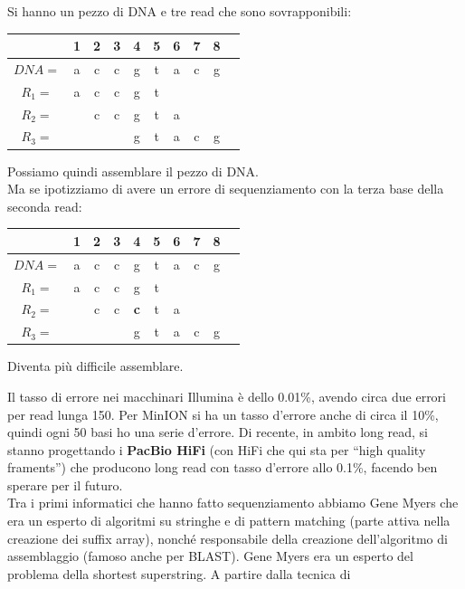 \documentclass[a4paper,12pt, oneside]{book}
\begin{document}
\begin{esempio}
  Si hanno un pezzo di DNA e tre read che sono sovrapponibili:
  \begin{table}[H]
    \centering
    \begin{tabular}{cccccccccc}
      \hline
      & 1 & 2 & 3 & 4 & 5 &6 &7 &8\\
      \hline
      $DNA=$ & a & c & c & g & t &a &c &g\\
      \hline
      $R_1=$ & a & c & c & g & t &&&\\
      $R_2=$ &  & c & c & g & t & a &&\\
      $R_3=$ &  &  &  & g &t & a &c & g&\\
    \end{tabular}
  \end{table}
  Possiamo quindi assemblare il pezzo di DNA.\\
  Ma se ipotizziamo di avere un errore di sequenziamento con la terza base della
  seconda read:
   \begin{table}[H]
    \centering
    \begin{tabular}{cccccccccc}
      \hline
      & 1 & 2 & 3 & 4 & 5 &6 &7 &8\\
      \hline
      $DNA=$ & a & c & c & g & t &a &c &g\\
      \hline
      $R_1=$ & a & c & c & g & t &&&\\
      $R_2=$ &  & c & c & \textbf{c} & t & a &&\\
      $R_3=$ &  &  &  & g &t & a &c & g&\\
    \end{tabular}
  \end{table}
  Diventa più difficile assemblare.
\end{esempio}
Il tasso di errore nei macchinari Illumina è dello 0.01\%, avendo circa due
errori per read lunga 150. Per MinION si ha un tasso d'errore anche di circa il
10\%, quindi ogni 50 basi ho una serie d'errore. Di recente, in ambito long
read, si stanno progettando i \textbf{PacBio HiFi} (con HiFi che qui sta per
``high quality framents'') che producono long read con tasso d'errore allo
0.1\%, facendo ben sperare per il futuro.\\
Tra i primi informatici che hanno fatto sequenziamento abbiamo Gene Myers che
era un esperto di algoritmi su stringhe e di pattern matching (parte attiva
nella creazione dei suffix array), nonché responsabile della creazione
dell'algoritmo di assemblaggio (famoso anche per BLAST). Gene Myers era un
esperto del problema della shortest superstring. A partire dalla tecnica di
\end{document}
